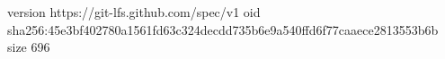 version https://git-lfs.github.com/spec/v1
oid sha256:45e3bf402780a1561fd63c324decdd735b6e9a540ffd6f77caaece2813553b6b
size 696
